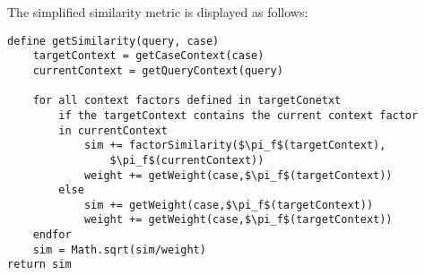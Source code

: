 The simplified similarity metric is displayed as follows:
\begin{lstlisting}[frame=single,caption=The simplified similarity metric]
define getSimilarity(query, case)
    targetContext = getCaseContext(case)
    currentContext = getQueryContext(query)

    for all context factors defined in targetConetxt
        if the targetContext contains the current context factor 
        in currentContext
            sim += factorSimilarity($\pi_f$(targetContext),
            	$\pi_f$(currentContext))
            weight += getWeight(case,$\pi_f$(targetContext))
        else
            sim += getWeight(case,$\pi_f$(targetContext))
            weight += getWeight(case,$\pi_f$(targetContext))
    endfor
    sim = Math.sqrt(sim/weight)
return sim
\end{lstlisting}




















